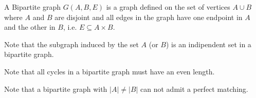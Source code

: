 \begin{definition}
	A Bipartite graph $G(A,B,E)$ is a graph defined on the set of vertices $A \cup B$ where $A$ and $B$ are disjoint and all edges in the graph have one endpoint in $A$ and the other in $B$, i.e. $E \subseteq A \times B$.
\end{definition}
Note that the subgraph induced by the set $A$ (or $B$) is an indipendent set in a bipartite graph.

Note that all cycles in a bipartite graph must have an even length.

Note that a bipartite graph with $|A| \neq |B|$ can not admit a perfect matching.

